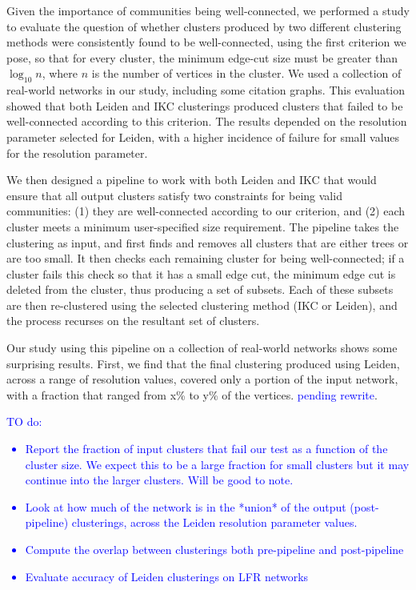 \documentclass[12pt, oneside]{article}   	%
\begin{document}
Given the importance of communities being well-connected, we performed a study to evaluate the question of whether clusters produced by two different clustering methods
were consistently found to be well-connected, using the first criterion we pose, so that for every cluster, the minimum edge-cut size must be greater than $\log_{10}n$, where $n$ is the number of vertices in the cluster. 
We used a collection of real-world networks in our study, including some citation graphs.
This evaluation showed that both Leiden and IKC clusterings produced clusters that failed to be well-connected according to this criterion.
The results depended on the resolution parameter selected for Leiden,  with a higher incidence of failure for small values for the resolution parameter.

We then designed a pipeline to work with both Leiden and IKC that would ensure that all output clusters satisfy two constraints for being valid communities: (1) they are well-connected according to our criterion, and (2) each cluster meets a minimum user-specified size requirement. The pipeline takes the clustering as input, and first finds and removes all clusters that are either trees or are too small.  It then checks each remaining cluster for being well-connected; if a cluster fails this check so that it has a small edge cut, the minimum edge cut is deleted from the cluster, thus producing a set of subsets.  Each of these subsets are then re-clustered using the selected clustering method (IKC or Leiden), and the process recurses on the resultant set of clusters.

Our study using this pipeline on a collection of real-world networks shows some surprising results. First, we find that the final clustering produced using Leiden, across a range of resolution values, 
covered only a portion of the input network, with a  fraction that ranged from x\% to y\% of the vertices. \textcolor{blue}{pending rewrite}.

\textcolor{blue}{TO do:
\begin{itemize}
\item Report the fraction of input clusters that fail our test as a function of the cluster size.
We expect this to be a large fraction for small clusters but it may continue into the larger clusters.
Will be good to note.
\item Look at how much of the network is in the *union* of the output (post-pipeline) clusterings, across the Leiden resolution parameter values.
\item Compute the overlap between clusterings both pre-pipeline and post-pipeline
\item  Evaluate accuracy of Leiden clusterings on LFR networks 
\end{itemize}
}
\end{document}
